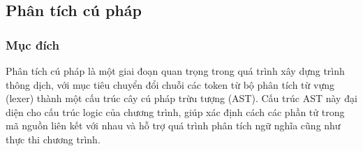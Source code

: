 \subsection{Phân tích cú pháp}
\subsubsection{Mục đích}
Phân tích cú pháp là một giai đoạn quan trọng trong quá trình xây dựng trình thông dịch, với mục tiêu chuyển đổi chuỗi các token từ bộ phân tích từ vựng (lexer) thành một cấu trúc cây cú pháp trừu tượng (AST). Cấu trúc AST này đại diện cho cấu trúc logic của chương trình, giúp xác định cách các phần tử trong mã nguồn liên kết với nhau và hỗ trợ quá trình phân tích ngữ nghĩa cũng như thực thi chương trình.

    
    
    

    
    
